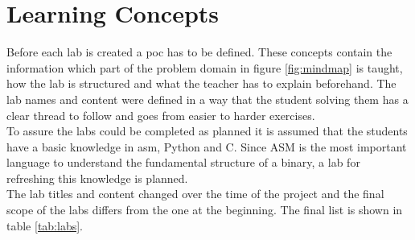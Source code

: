 \section{Learning Concepts}
Before each lab is created a \gls{poc} has to be defined. These concepts contain the information which part of the problem domain in figure \ref{fig:mindmap} is taught, how the lab is structured and what the teacher has to explain beforehand. The lab names and content were defined in a way that the student solving them has a clear thread to follow and goes from easier to harder exercises. \\
To assure the labs could be completed as planned it is assumed that the students have a basic knowledge in \acrfull{asm}, Python and C. Since ASM is the most important language to understand the fundamental structure of a \gls{binary}, a lab for refreshing this knowledge is planned.\\
The lab titles and content changed over the time of the project and the final scope of the labs differs from the one at the beginning. The final list is shown in table \ref{tab:labs}. 

